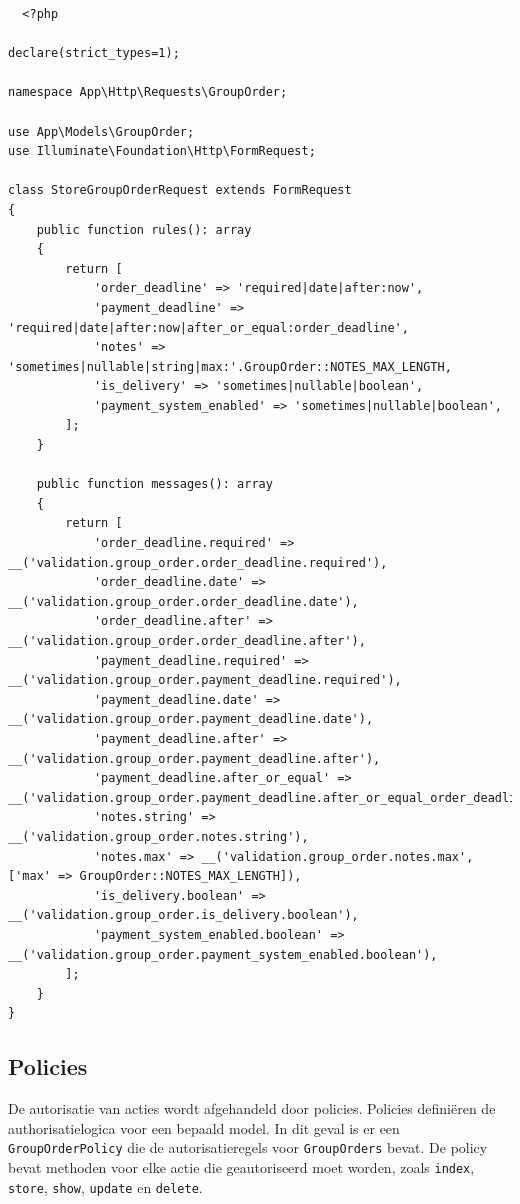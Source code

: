 \begin{verbatim}
  <?php

declare(strict_types=1);

namespace App\Http\Requests\GroupOrder;

use App\Models\GroupOrder;
use Illuminate\Foundation\Http\FormRequest;

class StoreGroupOrderRequest extends FormRequest
{
    public function rules(): array
    {
        return [
            'order_deadline' => 'required|date|after:now',
            'payment_deadline' => 'required|date|after:now|after_or_equal:order_deadline',
            'notes' => 'sometimes|nullable|string|max:'.GroupOrder::NOTES_MAX_LENGTH,
            'is_delivery' => 'sometimes|nullable|boolean',
            'payment_system_enabled' => 'sometimes|nullable|boolean',
        ];
    }

    public function messages(): array
    {
        return [
            'order_deadline.required' => __('validation.group_order.order_deadline.required'),
            'order_deadline.date' => __('validation.group_order.order_deadline.date'),
            'order_deadline.after' => __('validation.group_order.order_deadline.after'),
            'payment_deadline.required' => __('validation.group_order.payment_deadline.required'),
            'payment_deadline.date' => __('validation.group_order.payment_deadline.date'),
            'payment_deadline.after' => __('validation.group_order.payment_deadline.after'),
            'payment_deadline.after_or_equal' => __('validation.group_order.payment_deadline.after_or_equal_order_deadline'),
            'notes.string' => __('validation.group_order.notes.string'),
            'notes.max' => __('validation.group_order.notes.max', ['max' => GroupOrder::NOTES_MAX_LENGTH]),
            'is_delivery.boolean' => __('validation.group_order.is_delivery.boolean'),
            'payment_system_enabled.boolean' => __('validation.group_order.payment_system_enabled.boolean'),
        ];
    }
}

\end{verbatim}
\label{lst:storegrouporderrequest}

\subsection{Policies}

De autorisatie van acties wordt afgehandeld door policies. Policies definiëren de authorisatielogica voor een bepaald model. In dit geval is er een \texttt{GroupOrderPolicy} die de autorisatieregels voor \texttt{GroupOrders} bevat. De policy bevat methoden voor elke actie die geautoriseerd moet worden, zoals \texttt{index}, \texttt{store}, \texttt{show}, \texttt{update} en \texttt{delete}.

